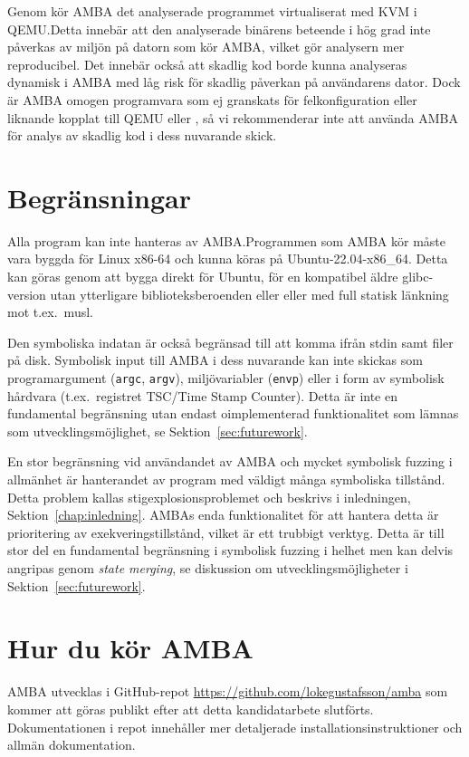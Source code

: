 Genom \stoe{} kör AMBA det analyserade programmet virtualiserat med KVM i
QEMU.\@ Detta innebär att den analyserade binärens beteende i hög grad inte
påverkas av miljön på datorn som kör AMBA, vilket gör analysern mer
reproducibel. Det innebär också att skadlig kod borde kunna analyseras dynamisk
i AMBA med låg risk för skadlig påverkan på användarens dator. Dock är AMBA
omogen programvara som ej granskats för felkonfiguration eller liknande kopplat
till QEMU eller \stoe{}, så vi rekommenderar inte att använda AMBA för analys av
skadlig kod i dess nuvarande skick.

\section{Begränsningar}

Alla program kan inte hanteras av AMBA.\@ Programmen som AMBA kör måste vara
byggda för Linux x86-64 och kunna köras på Ubuntu-22.04-x86\_64. Detta kan göras
genom att bygga direkt för Ubuntu, för en kompatibel äldre glibc-version utan
ytterligare biblioteksberoenden eller eller med full statisk länkning mot t.ex.\
musl.

Den symboliska indatan är också begränsad till att komma ifrån stdin samt filer
på disk. Symbolisk input till AMBA i dess nuvarande kan inte skickas som
programargument (\verb|argc|, \verb|argv|), miljövariabler (\verb|envp|) eller i
form av symbolisk hårdvara (t.ex.\ registret TSC/Time Stamp Counter). Detta är
inte en fundamental begränsning utan endast oimplementerad funktionalitet som
lämnas som utvecklingsmöjlighet, se Sektion~\ref{sec:futurework}.

En stor begränsning vid användandet av AMBA och mycket symbolisk fuzzing i
allmänhet är hanterandet av program med väldigt många symboliska tillstånd.
Detta problem kallas stigexplosionsproblemet och beskrivs i inledningen,
Sektion~\ref{chap:inledning}. AMBAs enda funktionalitet för att hantera detta är
prioritering av exekveringstillstånd, vilket är ett trubbigt verktyg. Detta är
till stor del en fundamental begränsning i symbolisk fuzzing i helhet men kan
delvis angripas genom \textit{state merging}, se diskussion om
utvecklingsmöjligheter i Sektion~\ref{sec:futurework}.

\section{Hur du kör AMBA}

AMBA utvecklas i GitHub-repot \url{https://github.com/lokegustafsson/amba} som
kommer att göras publikt efter att detta kandidatarbete slutförts.
Dokumentationen i repot innehåller mer detaljerade installationsinstruktioner
och allmän dokumentation.

